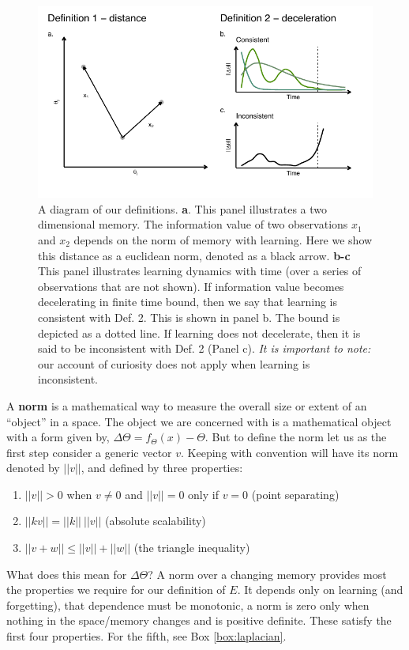 \begin{figure}
	\begin{fullwidth}
	\includegraphics[width=0.7\linewidth]{img/cartoon.pdf} 
	\caption{A diagram of our definitions. 
	\textbf{a}. This panel illustrates a two dimensional memory. The information value of two observations $x_1$ and $x_2$ depends on the norm of memory with learning. Here we show this distance as a euclidean norm, denoted as a black arrow.
	\textbf{b-c} This panel illustrates learning dynamics with time (over a series of observations that are not shown). If information value becomes decelerating in finite time bound, then we say that learning is consistent with Def. 2. This is shown in panel b. The bound is depicted as a dotted line. If learning does not decelerate, then it is said to be inconsistent with Def. 2 (Panel c). \textit{It is important to note:} our account of curiosity does not apply when learning is inconsistent.
  	}
	\label{fig:cartoon} 
	\end{fullwidth}
\end{figure}

\begin{featurebox}
\caption{Norms.}
\label{box:norm}
A \textbf{norm} is a mathematical way to measure the overall size or extent of an ``object'' in a space. The object we are concerned with is a mathematical object with a form given by, $\Delta \Theta = f_{\Theta}(x) - \Theta$. But to define the norm let us as the first step consider a generic vector $v$. Keeping with convention will have its norm denoted by $||v||$, and defined by three properties:

\begin{enumerate}
  \item $||v|| > 0$ when $v \neq 0$ and $||v|| = 0$ only if $v=0$ (point separating)
  \item $||k v|| = ||k||\ ||v||$ (absolute scalability)
  \item $||v + w|| \leq ||v|| + ||w||$ (the triangle inequality)
\end{enumerate}

What does this mean for $\Delta \Theta$? A norm over a changing memory provides most the properties we require for our definition of $E$. It depends only on learning (and forgetting), that dependence must be monotonic, a norm is zero only when nothing in the space/memory changes and is positive definite. These satisfy the first four properties. For the fifth, see Box \ref{box:laplacian}.
\medskip
\end{featurebox}

